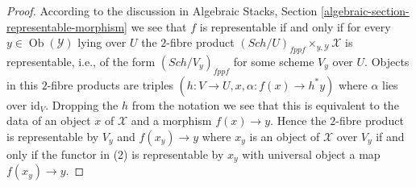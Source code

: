 \documentclass[10pt,a4paper]{amsart}
\theoremstyle{plain}
\theoremstyle{definition}
\theoremstyle{remark}
\numberwithin{equation}{subsection}
\def\Sch{\mathit{Sch}}
\def\Ob{\mathop{\mathrm{Ob}}\nolimits}
\begin{document}
\begin{proof}
According to the discussion in
Algebraic Stacks, Section \ref{algebraic-section-representable-morphism}
we see that $f$ is representable if and only if
for every $y \in \Ob(\mathcal{Y})$
lying over $U$ the $2$-fibre product
$(\Sch/U)_{fppf} \times_{y, \mathcal{Y}} \mathcal{X}$
is representable, i.e., of the form $(\Sch/V_y)_{fppf}$ for some
scheme $V_y$ over $U$. Objects in this $2$-fibre products are triples
$(h : V \to U, x, \alpha : f(x) \to h^*y)$ where $\alpha$ lies
over $\text{id}_V$. Dropping the $h$ from the notation we see that this
is equivalent to the data of an object $x$ of $\mathcal{X}$ and a
morphism $f(x) \to y$. Hence the $2$-fibre product is
representable by $V_y$ and $f(x_y) \to y$ where $x_y$ is an object
of $\mathcal{X}$ over $V_y$ if and only if the functor in (2) is representable
by $x_y$ with universal object a map $f(x_y) \to y$.
\end{proof}
\end{document}
